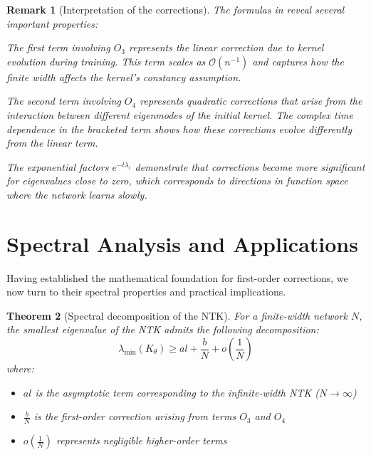 \documentclass[11pt,a4paper]{article}
\newtheorem{theorem}{Theorem}[section]
\newtheorem{remark}[theorem]{Remark}
\theoremstyle{definition}
\begin{document}
\begin{remark}[Interpretation of the corrections]
The formulas in  reveal several important properties:

The first term involving $O_3$ represents the linear correction due to kernel evolution during training. This term scales as $\mathcal{O}(n^{-1})$ and captures how the finite width affects the kernel's constancy assumption.

The second term involving $O_4$ represents quadratic corrections that arise from the interaction between different eigenmodes of the initial kernel. The complex time dependence in the bracketed term shows how these corrections evolve differently from the linear term.

The exponential factors $e^{-t\lambda_i}$ demonstrate that corrections become more significant for eigenvalues close to zero, which corresponds to directions in function space where the network learns slowly.
\end{remark}


\newpage

\section{Spectral Analysis and Applications}

Having established the mathematical foundation for first-order corrections, we now turn to their spectral properties and practical implications.

\begin{theorem}[Spectral decomposition of the NTK]\label{thm:spectral}
For a finite-width network $N$, the smallest eigenvalue of the NTK admits the following decomposition:
\[ \lambda_{\min}(K_\theta) \geq al + \frac{b}{N} + o(\frac{1}{N}) \]
where:
\begin{itemize}
\item $al$ is the asymptotic term corresponding to the infinite-width NTK ($N \to \infty$)
\item $\frac{b}{N}$ is the first-order correction arising from terms $O_3$ and $O_4$
\item $o(\frac{1}{N})$ represents negligible higher-order terms
\end{itemize}
\end{theorem}
\end{document}
